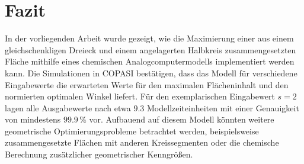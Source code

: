 \section{Fazit}

In der vorliegenden Arbeit wurde gezeigt, wie die Maximierung einer aus
einem gleichschenkligen Dreieck und einem angelagerten Halbkreis
zusammengesetzten Fläche mithilfe eines chemischen Analogcomputermodells
implementiert werden kann. Die Simulationen in COPASI bestätigen, dass das Modell für verschiedene Eingabewerte die erwarteten Werte für den maximalen
Flächeninhalt und den normierten optimalen Winkel liefert.
Für den exemplarischen Eingabewert \(s=2\) lagen alle Ausgabewerte nach
etwa \(9.3\) Modellzeiteinheiten mit einer Genauigkeit von mindestens
\(99.9\,\%\) vor. 
Aufbauend auf diesem Modell könnten weitere geometrische
Optimierungsprobleme betrachtet werden, beispielsweise zusammengesetzte
Flächen mit anderen Kreissegmenten oder die chemische Berechnung
zusätzlicher geometrischer Kenngrößen.
